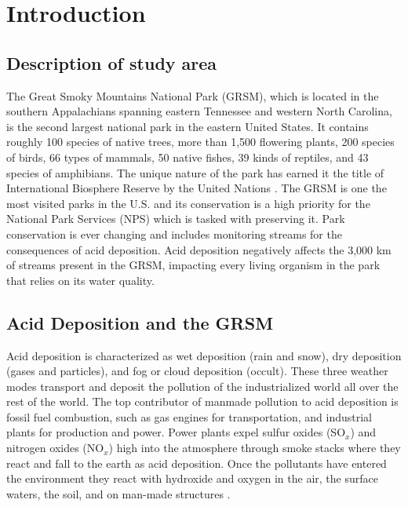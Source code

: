 \chapter{Introduction} \label{ch:intro}

\section{Description of study area}

The Great Smoky Mountains National Park (GRSM), which is located in the southern Appalachians spanning eastern Tennessee and western North Carolina, is the second largest national park in the eastern United States.
It contains roughly 100 species of native trees, more than 1,500 flowering plants, 200 species of birds, 66 types of mammals, 50 native fishes, 39 kinds of reptiles, and 43 species of amphibians.
The unique nature of the park has earned it the title of  International Biosphere Reserve by the United Nations \citep{NPS}.    
The GRSM is one the most visited parks in the U.S. and its conservation is a high priority for the National Park Services (NPS) which is tasked with preserving it.        
Park conservation is ever changing and  includes monitoring streams for the consequences of acid deposition.    
Acid deposition negatively affects the 3,000 km of streams present in the GRSM, impacting every living organism in the park that relies on its water quality.  
    
\section{Acid Deposition and the GRSM}

Acid deposition is characterized as wet deposition (rain and snow), dry deposition (gases and particles), and fog or cloud deposition (occult).
These three weather modes transport and deposit the pollution of the industrialized world all over the rest of the world.
The top contributor of  manmade pollution to acid deposition is fossil fuel combustion, such as gas engines for transportation, and industrial plants for production and power.
Power plants expel sulfur oxides (SO$_x$) and nitrogen oxides (NO$_x$) high into the atmosphere through smoke stacks where they react and fall to the earth as acid deposition.
Once the pollutants have entered the environment they react with hydroxide and oxygen in the air, the surface waters, the soil, and on man-made structures \citep{board1983acid}. 
 
